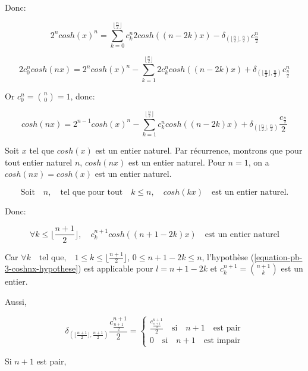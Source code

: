 \documentclass[12pt,a4paper,article]{memoir}
\newcommand{\floor}[1]{\lfloor #1 \rfloor}
\begin{document}
Donc:

\[
2^{n}cosh(x)^{n} = \sum_{k=0}^{\floor{\frac{n}{2}}} c_{k}^{n} 2cosh((n-2k)x) - \delta_{(\floor{\frac{n}{2}}, \frac{n}{2})} c_{\frac{n}{2}}^{n}
\]

\[
2c_{0}^{n} cosh(nx) = 2^{n}cosh(x)^{n} - \sum_{k=1}^{\floor{\frac{n}{2}}} 2c_{k}^{n}cosh((n-2k)x) + \delta_{(\floor{\frac{n}{2}}, \frac{n}{2})} c_{\frac{n}{2}}^{n}
\]

Or $c_{0}^{n} = \binom{n}{0} = 1$, donc:

\begin{equation}
cosh(nx) = 2^{n-1}cosh(x)^{n} - \sum_{k=1}^{\floor{\frac{n}{2}}} c_{k}^{n} cosh((n-2k)x) + \delta_{(\floor{\frac{n}{2}}, \frac{n}{2})} \frac{c_{\frac{n}{2}}}{2}
\label{equation-pb-3-coshnx-decomp}
\end{equation}

Soit $x$ tel que $cosh(x)$ est un entier naturel.
Par récurrence, montrons que pour tout entier naturel $n$, $cosh(nx)$ est un entier naturel. 
Pour $n = 1$, on a $cosh(nx)=cosh(x)$ est un entier naturel.

\begin{equation}
\textrm{Soit} \quad n, \quad \textrm{tel que pour tout} \quad k \leq n, \quad cosh(kx) \quad \textrm{est un entier naturel.}
\label{equation-pb-3-coshnx-hypothese}
\end{equation}

Donc:

\begin{equation}
\forall k \leq \floor{\frac{n+1}{2}}, \quad c_{k}^{n+1} cosh((n+1-2k)x) \quad \textrm{est un entier naturel}
\label{equation-pb-3-forall-coshlx}
\end{equation}

Car $\forall k \quad \textrm{tel que,} \quad 1 \leq k \leq \floor{\frac{n+1}{2}}$, $0 \leq n+1-2k \leq n$, l'hypothèse (\ref{equation-pb-3-coshnx-hypothese}) est applicable pour $l=n+1-2k$ et $c_{k}^{n+1} = \binom{n + 1}{k}$ est un entier. 

Aussi, 

\[\delta_{(\floor{\frac{n+1}{2}}, \frac{n+1}{2})} \frac{c_{\frac{n+1}{2}}^{n+1}}{2} = \left\{
	\begin{array}{l}
	\frac{c_{\frac{n+1}{2}}^{n+1}}{2} \quad \textrm{si} \quad n+1 \quad \textrm{est pair}\\
	0 \quad \textrm{si} \quad n+1 \quad \textrm{est impair}
	\end{array}
\right.\]

Si $n+1$ est pair,
\end{document}
